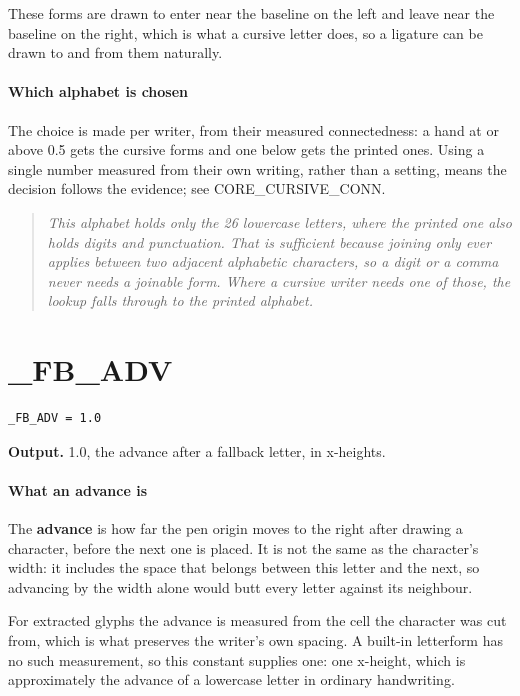 These forms are drawn to enter near the baseline on the left and leave near the baseline on the right, which is what a cursive letter does, so a ligature can be drawn to and from them naturally.


\paragraph{Which alphabet is chosen}
The choice is made per writer, from their measured connectedness: a hand at or above 0.5 gets the cursive forms and one below gets the printed ones. Using a single number measured from their own writing, rather than a setting, means the decision follows the evidence; see CORE\_CURSIVE\_CONN.


\begin{quote}\small\itshape This alphabet holds only the 26 lowercase letters, where the printed one also holds digits and punctuation. That is sufficient because joining only ever applies between two adjacent alphabetic characters, so a digit or a comma never needs a joinable form. Where a cursive writer needs one of those, the lookup falls through to the printed alphabet.\end{quote}

\section{\_FB\_ADV}
\begin{lstlisting}[style=sig]
_FB_ADV = 1.0
\end{lstlisting}

\noindent\textbf{Output.} 1.0, the advance after a fallback letter, in x-heights.


\paragraph{What an advance is}
The \textbf{advance} is how far the pen origin moves to the right after drawing a character, before the next one is placed. It is not the same as the character's width: it includes the space that belongs between this letter and the next, so advancing by the width alone would butt every letter against its neighbour.

For extracted glyphs the advance is measured from the cell the character was cut from, which is what preserves the writer's own spacing. A built-in letterform has no such measurement, so this constant supplies one: one x-height, which is approximately the advance of a lowercase letter in ordinary handwriting.


